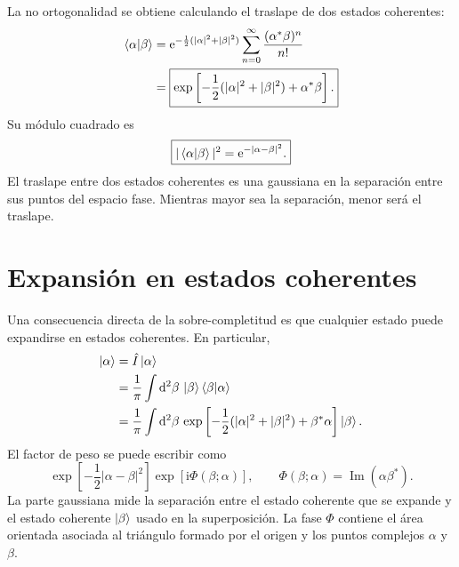 \documentclass[11pt]{article}
\newcommand{\ii}{\mathrm{i}}
\newcommand{\ee}{\mathrm{e}}
\newcommand{\dd}{\mathrm{d}}
\newcommand{\Imag}{\operatorname{Im}}
\begin{document}
La no ortogonalidad se obtiene calculando el traslape de dos estados
coherentes:
\begin{align}
  \braket{\alpha|\beta}
  &=
  \ee^{-\frac12(|\alpha|^2+|\beta|^2)}
  \sum_{n=0}^{\infty}
  \frac{(\alpha^*\beta)^n}{n!} \notag\\
  &=
  \boxed{
  \exp\left[
  -\frac12(|\alpha|^2+|\beta|^2)+\alpha^*\beta
  \right].
  }
\end{align}
Su m\'odulo cuadrado es
\begin{equation}
  \boxed{
  |\braket{\alpha|\beta}|^2
  =
  \ee^{-|\alpha-\beta|^2}.
  }
\end{equation}
El traslape entre dos estados coherentes es una gaussiana en la separaci\'on
entre sus puntos del espacio fase. Mientras mayor sea la separaci\'on, menor
ser\'a el traslape.

\section{Expansi\'on en estados coherentes}

Una consecuencia directa de la sobre-completitud es que cualquier estado puede
expandirse en estados coherentes. En particular,
\begin{align}
  \ket\alpha
  &=
  \hat I\ket\alpha \notag\\
  &=
  \frac1\pi\int\dd^2\beta\,\ket\beta\braket{\beta|\alpha} \notag\\
  &=
  \frac1\pi\int\dd^2\beta\,
  \exp\left[
  -\frac12(|\alpha|^2+|\beta|^2)+\beta^*\alpha
  \right]\ket\beta.
\end{align}
El factor de peso se puede escribir como
\begin{equation}
  \exp\left[
  -\frac12|\alpha-\beta|^2
  \right]
  \exp[\ii\Phi(\beta;\alpha)],
  \qquad
  \Phi(\beta;\alpha)=\Imag(\alpha\beta^*).
\end{equation}
La parte gaussiana mide la separaci\'on entre el estado coherente que se
expande y el estado coherente $\ket\beta$ usado en la superposici\'on. La fase
$\Phi$ contiene el \'area orientada asociada al tri\'angulo formado por el
origen y los puntos complejos $\alpha$ y $\beta$.
\end{document}
